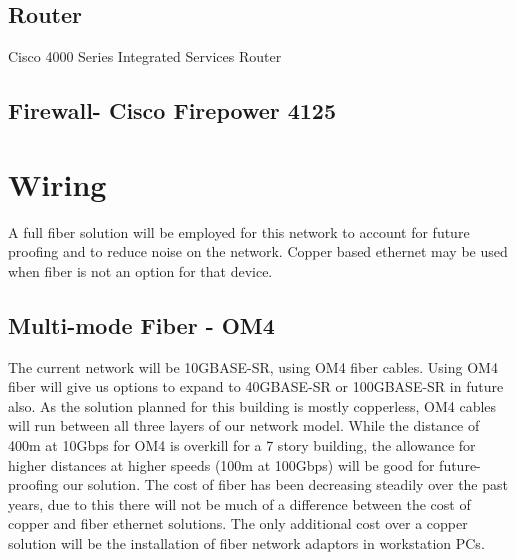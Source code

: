 \subsection{Router}
Cisco 4000 Series Integrated Services Router
\subsection{Firewall- Cisco Firepower 4125}

\section{Wiring}
A full fiber solution will be employed for this network to account for future proofing and to reduce noise on the network. Copper based ethernet may be used when fiber is not an option for that device.
\subsection{Multi-mode Fiber - OM4}
The current network will be 10GBASE-SR, using OM4 fiber cables. Using OM4 fiber will give us options to expand to 40GBASE-SR or 100GBASE-SR in future also.
As the solution planned for this building is mostly copperless, OM4 cables will run between all three layers of our network model.
While the distance of 400m at 10Gbps for OM4 is overkill for a 7 story building, the allowance for higher distances at higher speeds (100m at 100Gbps) will be good for future-proofing our solution.
The cost of fiber has been decreasing steadily over the past years, due to this there will not be much of a difference between the cost of copper and fiber ethernet solutions. The only additional cost over a copper solution will be the installation of fiber network adaptors in workstation PCs.
